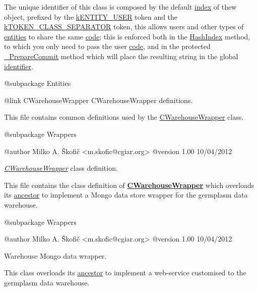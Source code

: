 The unique identifier of this class is composed by the default \hyperlink{}{index} of thew object, prefixed by the \hyperlink{}{k\-E\-N\-T\-I\-T\-Y\-\_\-\-U\-S\-E\-R} token and the \hyperlink{}{k\-T\-O\-K\-E\-N\-\_\-\-C\-L\-A\-S\-S\-\_\-\-S\-E\-P\-A\-R\-A\-T\-O\-R} token, this allows users and other types of \hyperlink{class_c_entity}{entities} to share the same \hyperlink{}{code}; this is enforced both in the \hyperlink{}{Hash\-Index} method, to which you only need to pass the user \hyperlink{}{code}, and in the protected \hyperlink{}{\-\_\-\-Prepare\-Commit} method which will place the resulting string in the global \hyperlink{}{identifier}.

\begin{DoxyVerb}    @subpackage     Entities\end{DoxyVerb}


\begin{DoxyVerb}   {@link CWarehouseWrapper CWarehouseWrapper} definitions.
\end{DoxyVerb}


This file contains common definitions used by the \hyperlink{class_c_warehouse_wrapper}{C\-Warehouse\-Wrapper} class.

\begin{DoxyVerb}    @subpackage     Wrappers

    @author         Milko A. Škofič <m.skofic@cgiar.org>
    @version        1.00 10/04/2012\end{DoxyVerb}


{\itshape \hyperlink{class_c_warehouse_wrapper}{C\-Warehouse\-Wrapper}} class definition.

This file contains the class definition of {\bfseries \hyperlink{class_c_warehouse_wrapper}{C\-Warehouse\-Wrapper}} which overloads its \hyperlink{class_c_mongo_data_wrapper}{ancestor} to implement a Mongo data store wrapper for the germplasm data warehouse.

\begin{DoxyVerb}    @subpackage     Wrappers

    @author         Milko A. Škofič <m.skofic@cgiar.org>
    @version        1.00 10/04/2012\end{DoxyVerb}


\begin{DoxyVerb}   Warehouse Mongo data wrapper.
\end{DoxyVerb}


This class overloads its \hyperlink{class_c_mongo_data_wrapper}{ancestor} to implement a web-\/service customised to the germplasm data warehouse.

